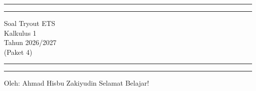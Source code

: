 \documentclass[10pt,openany,a4paper]{article}
\theoremstyle{definition}
\theoremstyle{definition}
\theoremstyle{plain}
\begin{document}
\begin{titlepage}
	\centering %
	\vspace*{1.5\baselineskip} %

	\rule{13cm}{1.6pt}\vspace*{-\baselineskip}\vspace*{2pt} %
	\rule{13cm}{0.4pt} %
	
		\vspace{0.75\baselineskip} %
	{	\Huge Soal Tryout ETS\\ 
			\vspace{4mm}
		Kalkulus 1 \\ \vspace{2mm} \huge{Tahun 2026/2027}\\ \vspace{2mm} \Large{(Paket 4)}\\	}
		\vspace{0.75\baselineskip} %
	\rule{13cm}{0.4pt}\vspace*{-\baselineskip}\vspace{3.2pt} %
	\rule{13cm}{1.6pt} %
	
		\vspace{1.75\baselineskip} %
{\large Oleh: Ahmad Hisbu Zakiyudin}
	\vfill
	\vspace{1mm}
\huge{Selamat Belajar!}
\end{titlepage}
\makeatletter
\setlength\fboxsep{3pt}
\setlength{\headheight}{24pt}
\end{document}

